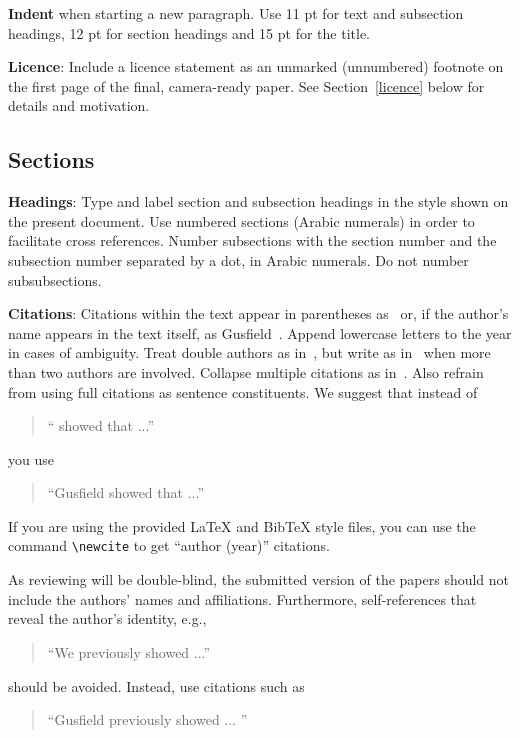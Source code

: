 \documentclass[11pt]{article}
\begin{document}
{\bf Indent} when starting a new paragraph. Use 11 pt for text and 
subsection headings, 12 pt for section headings and 15 pt for
the title. 

{\bf Licence}: Include a licence statement as an unmarked (unnumbered)
footnote on the first page of the final, camera-ready paper.
See Section~\ref{licence} below for details and motivation.


\subsection{Sections}

{\bf Headings}: Type and label section and subsection headings in the
style shown on the present document.  Use numbered sections (Arabic
numerals) in order to facilitate cross references. Number subsections
with the section number and the subsection number separated by a dot,
in Arabic numerals. Do not number subsubsections.

{\bf Citations}: Citations within the text appear in parentheses
as~\cite{Gusfield:97} or, if the author's name appears in the text
itself, as Gusfield~.  Append lowercase letters
to the year in cases of ambiguity.  Treat double authors as
in~\cite{Aho:72}, but write as in~\cite{Chandra:81} when more than two
authors are involved. Collapse multiple citations as
in~\cite{Gusfield:97,Aho:72}. Also refrain from using full citations
as sentence constituents. We suggest that instead of
\begin{quote}
  ``\cite{Gusfield:97} showed that ...''
\end{quote}
you use
\begin{quote}
``Gusfield    showed that ...''
\end{quote}

If you are using the provided \LaTeX{} and Bib\TeX{} style files, you
can use the command \verb|\newcite| to get ``author (year)'' citations.

As reviewing will be double-blind, the submitted version of the papers
should not include the authors' names and affiliations. Furthermore,
self-references that reveal the author's identity, e.g.,
\begin{quote}
``We previously showed \cite{Gusfield:97} ...''  
\end{quote}
should be avoided. Instead, use citations such as 
\begin{quote}
``Gusfield 
previously showed ... ''
\end{quote}
\end{document}
